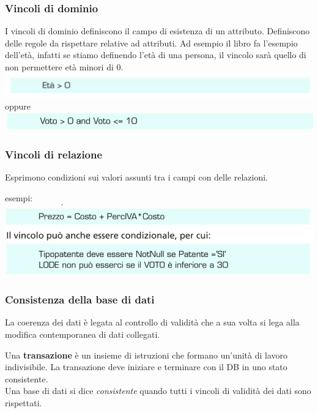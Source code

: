 \documentclass{article}
\begin{document}
\subsubsection{Vincoli di dominio}
I vincoli di dominio definiscono il campo di esistenza di un attributo. Definiscono delle regole da rispettare relative ad attributi. Ad esempio il libro fa l'esempio dell'età, infatti se stiamo definendo l'età di una persona, il vincolo sarà quello di non permettere età minori di 0.
\\
\includegraphics[h]{eta.PNG}
\\ oppure 
\\
\includegraphics[h]{voto.PNG}
\\

\subsubsection{Vincoli di relazione}
Esprimono condizioni sui valori assunti tra i campi con delle relazioni. 

\begin{footnotesize}

esempi:\\
\includegraphics[h, scale=0.8]{vincolo.PNG}
\end{footnotesize}

\subsubsection{Consistenza della base di dati}
La coerenza dei dati è legata al controllo di validità che a sua volta si lega alla modifica contemporanea di dati collegati.

Una \textbf{transazione} è un insieme di istruzioni che formano un'unità di lavoro indivisibile. La transazione deve iniziare e terminare con il DB in uno stato consistente.
\\
Una base di dati si dice \textit{consistente} quando tutti i vincoli di validità dei dati sono rispettati.
\end{document}
